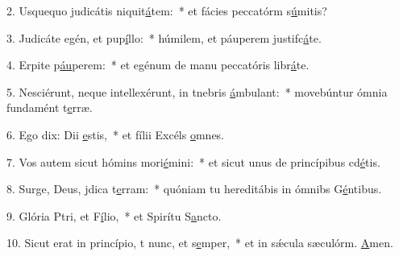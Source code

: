 2. Usquequo judicátis niquit\uline{á}tem:~* et fácies peccatórm s\uline{ú}mitis?\par 
3. Judicáte egén, et pup\uline{í}llo:~* húmilem, et páuperem justifc\uline{á}te.\par 
4. Erpite p\uline{áu}perem:~* et egénum de manu peccatóris libr\uline{á}te.\par 
5. Nesciérunt, neque intellexérunt, in tnebris \uline{á}mbulant:~* movebúntur ómnia fundamént t\uline{e}rræ.\par 
6. Ego dix: Dii \uline{e}stis,~* et fílii Excéls \uline{o}mnes.\par 
7. Vos autem sicut hómins mori\uline{é}mini:~* et sicut unus de princípibus cd\uline{é}tis.\par 
8. Surge, Deus, jdica t\uline{e}rram:~* quóniam tu hereditábis in ómnibs G\uline{é}ntibus.\par 
9. Glória Ptri, et F\uline{í}lio,~* et Spirítu S\uline{a}ncto.\par 
10. Sicut erat in princípio, t nunc, et s\uline{e}mper,~* et in sǽcula sæculórm. \uline{A}men.\par 
